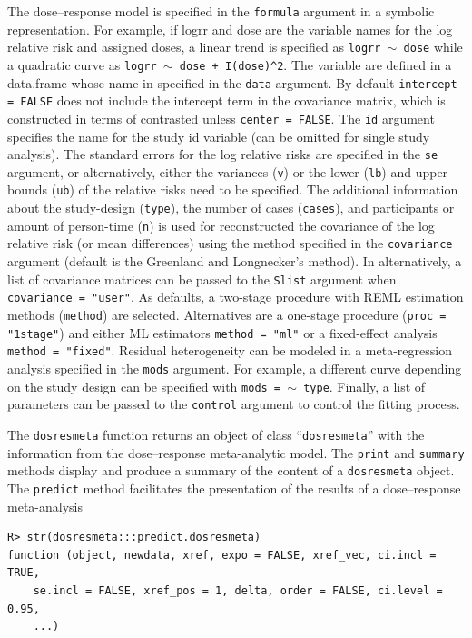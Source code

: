 \documentclass[11pt,a4paper,twoside,openany]{book}\usepackage{knitr}
\begin{document}
{\noindent The dose--response model is specified in the \texttt{formula} argument in a symbolic representation. For example, if logrr and dose are the variable names for the log relative risk and assigned doses, a linear trend is specified as \texttt{logrr $\sim$ dose} while a quadratic curve as \texttt{logrr $\sim$ dose + I(dose)\^{}2}. The variable are defined in a data.frame whose name in specified in the \texttt{data} argument. By default \texttt{intercept = FALSE} does not include the intercept term in the covariance matrix, which is constructed in terms of contrasted unless \texttt{center = FALSE}. The \texttt{id} argument specifies the name for the study id variable (can be omitted for single study analysis). 
The standard errors for the log relative risks are specified in the \texttt{se} argument, or alternatively, either the variances (\texttt{v}) or the lower (\texttt{lb}) and upper bounds (\texttt{ub}) of the relative risks need to be specified. The additional information about the study-design (\texttt{type}), the number of cases (\texttt{cases}), and participants or amount of person-time (\texttt{n}) is used for reconstructed the covariance of the log relative risk (or mean differences) using the method specified in the \texttt{covariance} argument (default is the Greenland and Longnecker’s method). In alternatively, a list of covariance matrices can be passed to the \texttt{Slist} argument when \texttt{covariance = "user"}.
As defaults, a two-stage procedure with REML estimation methods (\texttt{method}) are selected. Alternatives are a one-stage procedure (\texttt{proc = "1stage"}) and either ML estimators \texttt{method = "ml"} or a fixed-effect analysis \texttt{method = "fixed"}. Residual heterogeneity can be modeled in a meta-regression analysis specified in the \texttt{mods} argument. For example, a different curve depending on the study design can be specified with \texttt{mods = $\sim$ type}. Finally, a list of parameters can be passed to the \texttt{control} argument to control the fitting process.

The \texttt{dosresmeta} function returns an object of class ``\texttt{dosresmeta}'' with the information from the dose--response meta-analytic model. The \texttt{print} and \texttt{summary} methods display and produce a summary of the content of a \texttt{dosresmeta} object. The \texttt{predict} method facilitates the presentation of the results of a dose--response meta-analysis

\begin{knitrout}\footnotesize
{}\color{fgcolor}\begin{kframe}
\begin{verbatim}
R> str(dosresmeta:::predict.dosresmeta)
function (object, newdata, xref, expo = FALSE, xref_vec, ci.incl = TRUE, 
    se.incl = FALSE, xref_pos = 1, delta, order = FALSE, ci.level = 0.95, 
    ...)  
\end{verbatim}
\end{kframe}
\end{knitrout}

}
\end{document}
